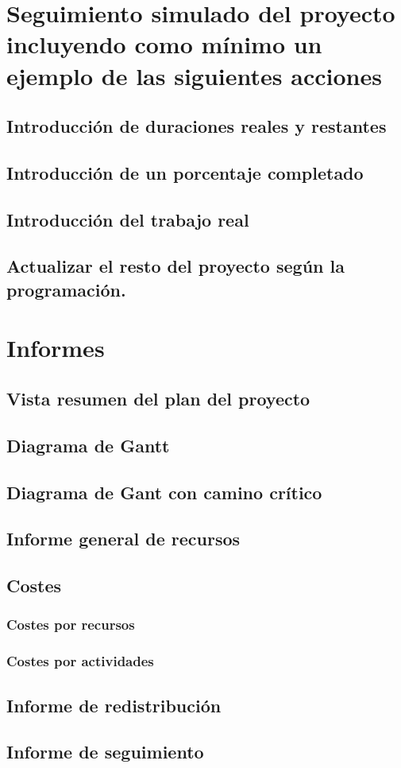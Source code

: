 \documentclass[11pt,a4paper,spanish,twoside]{report}
\begin{document}
\chapter{Seguimiento simulado del proyecto incluyendo como 
  mínimo un ejemplo de las siguientes acciones}
\section{Introducción de duraciones reales y restantes}

\section{Introducción de un porcentaje completado}

\section{Introducción del trabajo real}

\section{Actualizar el resto del proyecto según la programación.}

\chapter{Informes}
\section{Vista resumen del plan del proyecto}

\section{Diagrama de Gantt}

\section{Diagrama de Gant con camino crítico}

\section{Informe general de recursos}

\section{Costes}
\subsection{Costes por recursos}
\subsection{Costes por actividades}

\section{Informe de redistribución}

\section{Informe de seguimiento}


 

\end{document}
